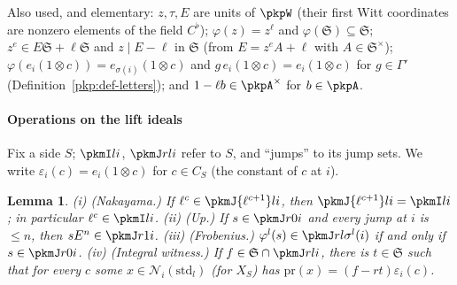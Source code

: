 \documentclass[10pt]{amsart}
\newtheorem{lemma}[theorem]{Lemma}
\theoremstyle{definition}
\theoremstyle{remark}
\begin{document}
Also used, and elementary: $z,\tau,E$ are units of $\pkpW$ (their first Witt coordinates are nonzero
elements of the field $C^\flat$); $\varphi(z)=z^\ell$ and $\varphi(\mathfrak S)\subseteq\mathfrak S$; $z^e\in
E\mathfrak S+\ell\mathfrak S$ and $z\mid E-\ell$ in $\mathfrak S$ (from $E=z^eA+\ell$ with $A\in\mathfrak
S^\times$); $\varphi(e_i(1\otimes c))=e_{\sigma(i)}(1\otimes c)$ and $g\,e_i(1\otimes c)=e_i(1\otimes c)$
for $g\in\Gamma'$ (Definition~\ref{pkp:def-letters}); and $1-\ell b\in\pkpA^\times$ for $b\in\pkpA$.

\paragraph*{Operations on the lift ideals}

Fix a side $S$; $\pkmI li$, $\pkmJ rli$ refer to $S$, and ``jumps'' to its jump sets. We write
$\varepsilon_i(c)=e_i(1\otimes c)$ for $c\in C_S$ (the constant of $c$ at $i$).

\begin{lemma}\label{pkm:J-basic}
(i) (Nakayama.) If $\ell^c\in\pkmJ{\ell^{c+1}}li$, then $\pkmJ{\ell^{c+1}}li=\pkmI li$; in particular
$\ell^c\in\pkmI li$.
(ii) (Up.) If $s\in\pkmJ r0i$ and every jump at $i$ is $\le n$, then $sE^n\in\pkmJ r1i$.
(iii) (Frobenius.) $\varphi^l(s)\in\pkmJ rl{\sigma^l(i)}$ if and only if $s\in\pkmJ r0i$.
(iv) (Integral witness.) If $f\in\mathfrak S\cap\pkmJ rli$, there is $t\in\mathfrak S$ such that for every
$c$ some $x\in\mathcal N_i(\mathrm{std}_l)$ (for $X_S$) has $\mathrm{pr}(x)=(f-rt)\varepsilon_i(c)$.
\end{lemma}
\end{document}
